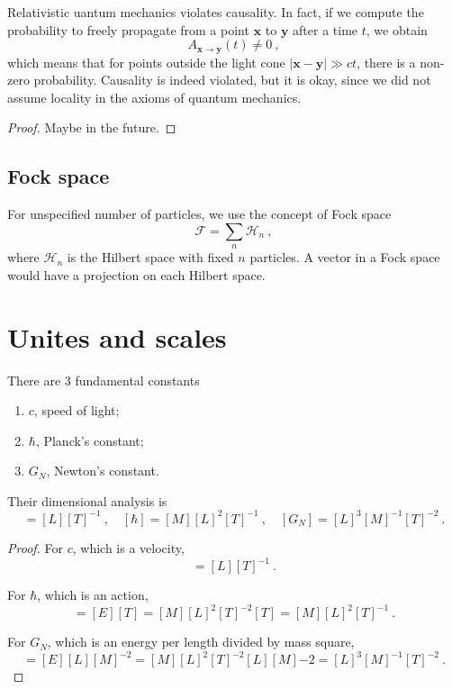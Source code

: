     Relativistic uantum mechanics violates causality. In fact, if we compute the probability to freely propagate from a point $\mathbf x$ to $\mathbf y$ after a time $t$, we obtain 
    \begin{equation*}
        A_{\mathbf x \rightarrow \mathbf y} (t) \neq 0 ~,
    \end{equation*}
    which means that for points outside the light cone $|\mathbf x - \mathbf y| \gg ct$, there is a non-zero probability. Causality is indeed violated, but it is okay, since we did not assume locality in the axioms of quantum mechanics.
    \begin{proof}
        Maybe in the future.
    \end{proof}

\section{Fock space}

    For unspecified number of particles, we use the concept of Fock space 
    \begin{equation*}
        \mathcal F = \sum_n \mathcal H_n ~,
    \end{equation*}
    where $\mathcal H_n$ is the Hilbert space with fixed $n$ particles. A vector in a Fock space would have a projection on each Hilbert space.


\chapter{Unites and scales}

    There are $3$ fundamental constants 
    \begin{enumerate}
        \item $c$, speed of light;
        \item $\hbar$, Planck's constant;
        \item $G_N$, Newton's constant.
    \end{enumerate}
    Their dimensional analysis is 
    \begin{equation*}
        [c] = [L][T]^{-1} ~, \quad [\hbar] = [M] [L]^2 [T]^{-1} ~, \quad [G_N] = [L]^3 [M]^{-1} [T]^{-2} ~.
    \end{equation*}
    \begin{proof}
        For $c$, which is a velocity,
        \begin{equation*}
            [c] = [L][T]^{-1} ~.
        \end{equation*}

        For $\hbar$, which is an action,
        \begin{equation*}
            [c] = [E][T] = [M] [L]^2 [T]^{-2} [T] = [M] [L]^2 [T]^{-1}  ~.
        \end{equation*}

        For $G_N$, which is an energy per length divided by mass square,
        \begin{equation*}
            [G_N] = [E] [L] [M]^{-2} = [M] [L]^2 [T]^{-2} [L] [M]{-2} = [L]^3 [M]^{-1} [T]^{-2} ~.
        \end{equation*}
    \end{proof}

